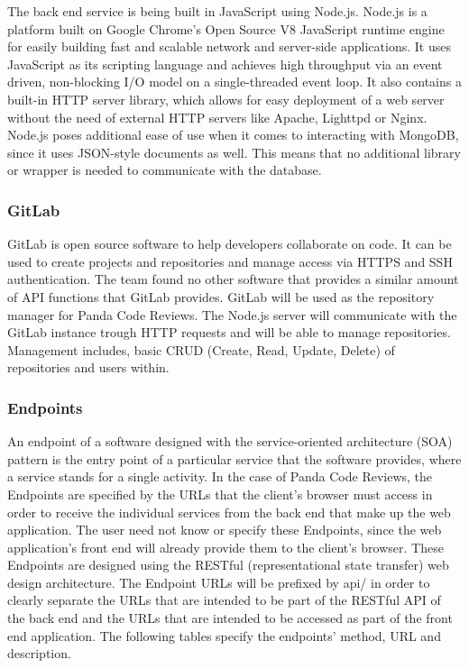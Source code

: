 The back end service is being built in JavaScript using Node.js\cite{nodejs}.
Node.js is a platform built on Google Chrome's Open Source V8 JavaScript runtime
engine for easily building fast and scalable network and server-side
applications. It uses JavaScript as its scripting language and achieves high
throughput via an event driven, non-blocking I/O model on a single-threaded
event loop. It also contains a built-in HTTP server library, which allows for
easy deployment of a web server without the need of external HTTP servers like
Apache, Lighttpd or Nginx. Node.js poses additional ease of use when it comes to
interacting with MongoDB, since it uses JSON-style documents as well. This means
that no additional library or wrapper is needed to communicate with the
database.

\subsubsection{GitLab}

GitLab\cite{gitlab} is open source software to help developers collaborate on
code. It can be used to create projects and repositories and manage access via
HTTPS and SSH authentication. The team found no other software that provides a
similar amount of API functions that GitLab provides. GitLab will be used as the
repository manager for Panda Code Reviews. The Node.js server will communicate
with the GitLab instance trough HTTP requests and will be able to manage
repositories. Management includes, basic CRUD (Create, Read, Update, Delete) of
repositories and users within.

\subsubsection{Endpoints}

An endpoint of a software designed with the service-oriented architecture (SOA)
pattern is the entry point of a particular service that the software provides,
where a service stands for a single activity. In the case of Panda Code Reviews,
the Endpoints are specified by the URLs that the client's browser must access in
order to receive the individual services from the back end that make up the web
application. The user need not know or specify these Endpoints, since the web
application's front end will already provide them to the client's browser. These
Endpoints are designed using the RESTful (representational state transfer) web
design architecture. The Endpoint URLs will be prefixed by api/ in order to
clearly separate the URLs that are intended to be part of the RESTful API of the
back end and the URLs that are intended to be accessed as part of the front end
application. The following tables specify the endpoints' method, URL and
description.

